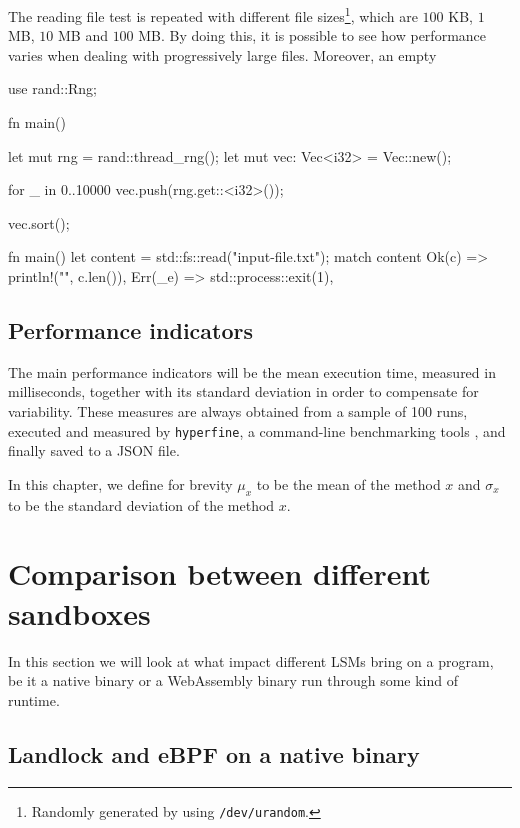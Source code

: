 The reading file test is repeated with different file sizes\footnote{Randomly generated by using \texttt{/dev/urandom}.},
which are $100$ KB, $1$ MB, $10$ MB and $100$ MB. By doing this, it is possible to see how performance
varies when dealing with progressively large files. Moreover, an empty 

\vspace*{0.5cm}
\begin{code}[language=Rust, caption=The tested ``sorting program''., label=lst:sorting-test-rust]
use rand::Rng;

fn main() {
  let mut rng = rand::thread_rng();
  let mut vec: Vec<i32> = Vec::new();

  for _ in 0..10000 {
    vec.push(rng.get::<i32>());
  }

  vec.sort();
}
\end{code}

\begin{code}[language=Rust, caption=The tested ``reading program''., label=lst:reading-test-rust]
fn main() {
  let content = std::fs::read("input-file.txt");
  match content {
      Ok(c) => println!("{}", c.len()),
      Err(_e) => std::process::exit(1),
  }
}
\end{code}

\subsection{Performance indicators}

The main performance indicators will be the mean execution time, measured in milliseconds, together with its
standard deviation in order to compensate for variability.
These measures are always obtained from a sample of 100 runs, executed and measured by \texttt{hyperfine},
a command-line benchmarking tools \cite{hyperfine}, and finally saved to a
JSON file.

In this chapter, we define for brevity $\mu_x$ to be the mean of the method $x$ and $\sigma_x$ to be
the standard deviation of the method $x$.

\section{Comparison between different sandboxes}

In this section we will look at what impact different LSMs bring on a program,
be it a native binary or a WebAssembly binary run through some kind of runtime.

\subsection{Landlock and eBPF on a native binary}
\label{sec:landlock-vs-ebpf-native}

